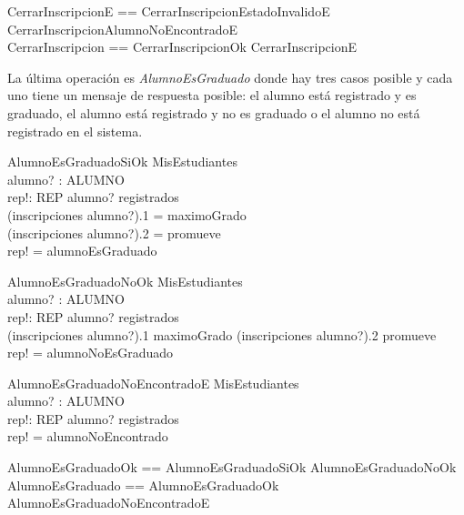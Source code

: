 \documentclass{article}
\begin{document}
\begin{zed}
    CerrarInscripcionE == CerrarInscripcionEstadoInvalidoE \lor CerrarInscripcionAlumnoNoEncontradoE \\
    CerrarInscripcion == CerrarInscripcionOk \lor CerrarInscripcionE
\end{zed}

La última operación es \emph{AlumnoEsGraduado} donde hay tres casos posible y cada uno tiene un mensaje de respuesta posible: el alumno está registrado y es graduado, el alumno está registrado y no es graduado o el alumno no está registrado en el sistema.
\begin{schema}{AlumnoEsGraduadoSiOk}
    \Xi MisEstudiantes \\
    alumno? : ALUMNO \\
    rep!: REP
    \where
    alumno? \in registrados \\
    (inscripciones \; alumno?).1 = maximoGrado \\
    (inscripciones \; alumno?).2 = promueve \\
    rep! = alumnoEsGraduado
\end{schema}

\begin{schema}{AlumnoEsGraduadoNoOk}
    \Xi MisEstudiantes \\
    alumno? : ALUMNO \\
    rep!: REP
    \where
    alumno? \in registrados \\
    (inscripciones \; alumno?).1 \neq maximoGrado \lor (inscripciones \; alumno?).2 \neq promueve \\
    rep! = alumnoNoEsGraduado
\end{schema}

\begin{schema}{AlumnoEsGraduadoNoEncontradoE}
    \Xi MisEstudiantes \\
    alumno? : ALUMNO \\
    rep!: REP
    \where
    alumno? \notin registrados \\
    rep! = alumnoNoEncontrado
\end{schema}

\begin{zed}
    AlumnoEsGraduadoOk == AlumnoEsGraduadoSiOk \lor AlumnoEsGraduadoNoOk \\
    AlumnoEsGraduado == AlumnoEsGraduadoOk \lor AlumnoEsGraduadoNoEncontradoE \\
\end{zed}
\end{document}
